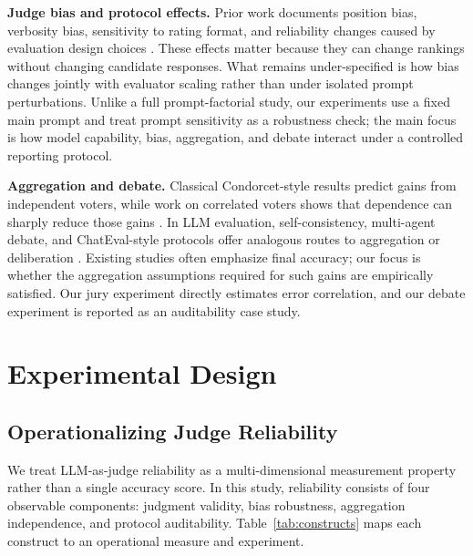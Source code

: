 \documentclass[sigconf,nonacm]{acmart}
\begin{document}
\textbf{Judge bias and protocol effects.}
Prior work documents position bias, verbosity bias, sensitivity to rating format, and reliability changes caused by evaluation design choices \citep{dubois2024length,saito2023verbosity,wang2023fair,yamauchi2025designchoices}. These effects matter because they can change rankings without changing candidate responses. What remains under-specified is how bias changes jointly with evaluator scaling rather than under isolated prompt perturbations. Unlike a full prompt-factorial study, our experiments use a fixed main prompt and treat prompt sensitivity as a robustness check; the main focus is how model capability, bias, aggregation, and debate interact under a controlled reporting protocol.

\textbf{Aggregation and debate.}
Classical Condorcet-style results predict gains from independent voters, while work on correlated voters shows that dependence can sharply reduce those gains \citep{condorcet1785essai,ladha1992condorcet}. In LLM evaluation, self-consistency, multi-agent debate, and ChatEval-style protocols offer analogous routes to aggregation or deliberation \citep{wang2023selfconsistency,du2023debate,liang2023divergent,chan2023chateval,khan2024debating}. Existing studies often emphasize final accuracy; our focus is whether the aggregation assumptions required for such gains are empirically satisfied. Our jury experiment directly estimates error correlation, and our debate experiment is reported as an auditability case study.

\section{Experimental Design}

\subsection{Operationalizing Judge Reliability}

We treat LLM-as-judge reliability as a multi-dimensional measurement property rather than a single accuracy score. In this study, reliability consists of four observable components: judgment validity, bias robustness, aggregation independence, and protocol auditability. Table~\ref{tab:constructs} maps each construct to an operational measure and experiment.
\end{document}

